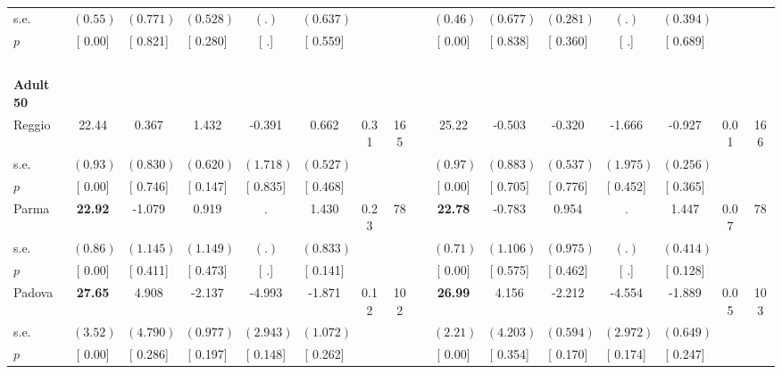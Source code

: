 \begin{longtable}{L{8em} c c c c c c c p{1em} c c c c c c c}
\quad \quad \quad \quad s.e.& $ (     0.55)$ & $ (    0.771)$ & $ (    0.528)$ & $ (        .)$ & $ (    0.637)$ & & & & $ (     0.46)$ & $ (    0.677)$ & $ (    0.281)$ & $ (        .)$ & $ (    0.394)$ & &  \\*
\quad \quad \quad \quad $ p$ & [     0.00] & [    0.821] & [    0.280] & [        .] & [    0.559] & & & & [     0.00] & [    0.838] & [    0.360] & [        .] & [    0.689] & &  \\[1em]
~\\[1em]
\quad \quad \textbf{Adult 50} & & & & & & & & & & & & & & & \\* 
\quad \quad \quad Reggio& 22.44 &     0.367 &     1.432 &    -0.391 &     0.662 &      0.31 &       165 & & 25.22 &    -0.503 &    -0.320 &    -1.666 &    -0.927 &      0.01 &       166  \\*
\quad \quad \quad \quad s.e.& $ (     0.93)$ & $ (    0.830)$ & $ (    0.620)$ & $ (    1.718)$ & $ (    0.527)$ & & & & $ (     0.97)$ & $ (    0.883)$ & $ (    0.537)$ & $ (    1.975)$ & $ (    0.256)$ & &  \\*
\quad \quad \quad \quad $ p$ & [     0.00] & [    0.746] & [    0.147] & [    0.835] & [    0.468] & & & & [     0.00] & [    0.705] & [    0.776] & [    0.452] & [    0.365] & &  \\[1em]
\quad \quad \quad Parma& \textbf{    22.92} &    -1.079 &     0.919 &         . &     1.430 &      0.23 &        78 & & \textbf{    22.78} &    -0.783 &     0.954 &         . &     1.447 &      0.07 &        78  \\*
\quad \quad \quad \quad s.e.& $ (     0.86)$ & $ (    1.145)$ & $ (    1.149)$ & $ (        .)$ & $ (    0.833)$ & & & & $ (     0.71)$ & $ (    1.106)$ & $ (    0.975)$ & $ (        .)$ & $ (    0.414)$ & &  \\*
\quad \quad \quad \quad $ p$ & [     0.00] & [    0.411] & [    0.473] & [        .] & [    0.141] & & & & [     0.00] & [    0.575] & [    0.462] & [        .] & [    0.128] & &  \\[1em]
\quad \quad \quad Padova& \textbf{    27.65} &     4.908 &    -2.137 &    -4.993 &    -1.871 &      0.12 &       102 & & \textbf{    26.99} &     4.156 &    -2.212 &    -4.554 &    -1.889 &      0.05 &       103  \\*
\quad \quad \quad \quad s.e.& $ (     3.52)$ & $ (    4.790)$ & $ (    0.977)$ & $ (    2.943)$ & $ (    1.072)$ & & & & $ (     2.21)$ & $ (    4.203)$ & $ (    0.594)$ & $ (    2.972)$ & $ (    0.649)$ & &  \\*
\quad \quad \quad \quad $ p$ & [     0.00] & [    0.286] & [    0.197] & [    0.148] & [    0.262] & & & & [     0.00] & [    0.354] & [    0.170] & [    0.174] & [    0.247] & &  \\[1em]

\end{longtable}
